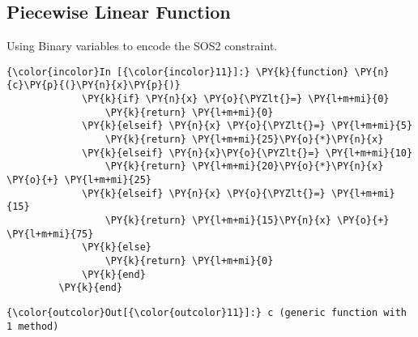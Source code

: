 
\subsection{Piecewise Linear Function}
Using Binary variables to encode the SOS2 constraint.
\begin{codeCell}
\label{code:pwl}

    \begin{Verbatim}[commandchars=\\\{\}]
{\color{incolor}In [{\color{incolor}11}]:} \PY{k}{function} \PY{n}{c}\PY{p}{(}\PY{n}{x}\PY{p}{)}
             \PY{k}{if} \PY{n}{x} \PY{o}{\PYZlt{}=} \PY{l+m+mi}{0}
                 \PY{k}{return} \PY{l+m+mi}{0}
             \PY{k}{elseif} \PY{n}{x} \PY{o}{\PYZlt{}=} \PY{l+m+mi}{5}
                 \PY{k}{return} \PY{l+m+mi}{25}\PY{o}{*}\PY{n}{x}
             \PY{k}{elseif} \PY{n}{x}\PY{o}{\PYZlt{}=} \PY{l+m+mi}{10}
                 \PY{k}{return} \PY{l+m+mi}{20}\PY{o}{*}\PY{n}{x} \PY{o}{+} \PY{l+m+mi}{25}
             \PY{k}{elseif} \PY{n}{x} \PY{o}{\PYZlt{}=} \PY{l+m+mi}{15}
                 \PY{k}{return} \PY{l+m+mi}{15}\PY{n}{x} \PY{o}{+} \PY{l+m+mi}{75}
             \PY{k}{else}
                 \PY{k}{return} \PY{l+m+mi}{0}
             \PY{k}{end}
         \PY{k}{end}
\end{Verbatim}


\begin{Verbatim}[commandchars=\\\{\}]
{\color{outcolor}Out[{\color{outcolor}11}]:} c (generic function with 1 method)
\end{Verbatim}
            

\end{codeCell}
